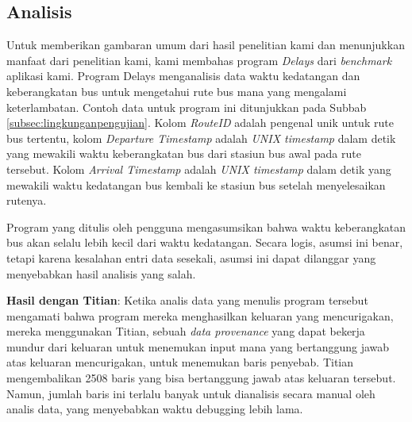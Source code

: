 
\subsection{Analisis}
\label{subsec:analisis}

Untuk memberikan gambaran umum dari hasil penelitian kami 
dan menunjukkan manfaat dari penelitian kami, kami membahas 
program \emph{Delays} dari \emph{benchmark} aplikasi kami. 
Program Delays menganalisis data waktu kedatangan dan 
keberangkatan bus untuk mengetahui rute bus mana yang 
mengalami keterlambatan. Contoh data untuk program ini 
ditunjukkan pada Subbab \ref{subsec:lingkunganpengujian}.
Kolom \emph{RouteID} adalah pengenal unik untuk rute 
bus tertentu, kolom \emph{Departure Timestamp} adalah 
\emph{UNIX timestamp} dalam detik yang mewakili waktu 
keberangkatan bus dari stasiun bus awal pada rute tersebut. 
Kolom \emph{Arrival Timestamp} adalah \emph{UNIX timestamp} 
dalam detik yang mewakili waktu kedatangan bus kembali 
ke stasiun bus setelah menyelesaikan rutenya.

Program yang ditulis oleh pengguna mengasumsikan bahwa 
waktu keberangkatan bus akan selalu lebih kecil dari 
waktu kedatangan. Secara logis, asumsi ini benar, 
tetapi karena kesalahan entri data sesekali, asumsi 
ini dapat dilanggar yang menyebabkan hasil analisis 
yang salah.

\textbf{Hasil dengan Titian}: Ketika analis data yang 
menulis program tersebut mengamati bahwa program mereka 
menghasilkan keluaran yang mencurigakan, mereka 
menggunakan Titian, sebuah \emph{data provenance} 
yang dapat bekerja mundur dari keluaran untuk menemukan 
input mana yang bertanggung jawab atas keluaran 
mencurigakan, untuk menemukan baris penyebab. 
Titian mengembalikan 2508 baris yang bisa bertanggung 
jawab atas keluaran tersebut. Namun, jumlah baris ini 
terlalu banyak untuk dianalisis secara manual oleh 
analis data, yang menyebabkan waktu debugging lebih lama.


